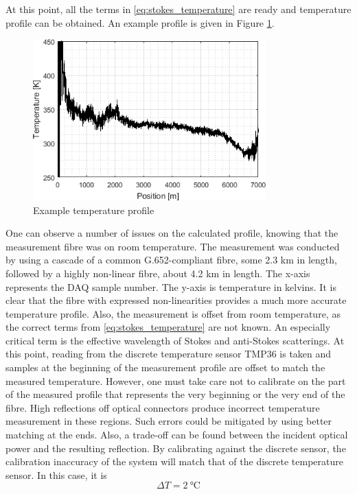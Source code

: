 \documentclass{standalone}
\begin{document}
At this point, all the terms in \ref{eq:stokes_temperature} are ready and temperature profile can be obtained. An example profile is given in Figure \ref{fig:temperature_example}.
\begin{figure}[h]
	\centering
	\includegraphics[width=0.8\textwidth]{temperature_example.png}
	\caption{Example temperature profile}
	\label{fig:temperature_example}
\end{figure}
One can observe a number of issues on the calculated profile, knowing that the measurement fibre was on room temperature. The measurement was conducted by using a cascade of a common G.652-compliant fibre, some 2.3 km in length, followed by a highly non-linear fibre, about 4.2 km in length. The x-axis represents the DAQ sample number. The y-axis is temperature in kelvins. It is clear that the fibre with expressed non-linearities provides a much more accurate temperature profile. Also, the measurement is offset from room temperature, as the correct terms from \ref{eq:stokes_temperature} are not known. An especially critical term is the effective wavelength of Stokes and anti-Stokes scatterings. At this point, reading from the discrete temperature sensor TMP36 is taken and samples at the beginning of the measurement profile are offset to match the measured temperature. However, one must take care not to calibrate on the part of the measured profile that represents the very beginning or the very end of the fibre. High reflections off optical connectors produce incorrect temperature measurement in these regions. Such errors could be mitigated by using better matching at the ends. Also, a trade-off can be found between the incident optical power and the resulting reflection. By calibrating against the discrete sensor, the calibration inaccuracy of the system will match that of the discrete temperature sensor. In this case, it is \cite{datasheet:tmp36}
\begin{equation}
\varDelta T = \SI{2}{\celsius}
\end{equation}
\end{document}
